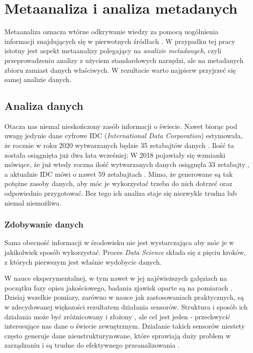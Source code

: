 \chapter{Metaanaliza i analiza metadanych} \label{ch:chapter1}

Metaanaliza oznacza wtórne odkrywanie wiedzy za pomocą uogólnienia informacji znajdujących się w pierwotnych źródłach \cite{higgins2019cochrane}.
W przypadku tej pracy istotny jest aspekt metaanalizy polegający na \textit{analizie metadanych}, czyli przeprowadzeniu analizy z użyciem standardowych narzędzi, ale na metadanych zbioru zamiast danych właściwych.
W rezultacie warto najpierw przyjrzeć się samej analizie danych.

\section{Analiza danych} \label{sec:1AnalizaDanych}

Otacza nas niemal nieskończony zasób informacji o świecie.
Nawet biorąc pod uwagę jedynie dane cyfrowe IDC (\textit{International Data Corporation}) estymowała, że rocznie w roku 2020 wytwarzanych będzie 35 zetabajtów danych \cite{tien2013big}.
Ilość ta została osiągnięta już dwa lata wcześniej; W 2018 pojawiały się wzmianki mówiące, że już wtedy roczna ilość wytwarzanych danych osiągnęła 33 zetabajty \cite{Patrizio:2018}, a aktualnie IDC mówi o nawet 59 zetabajtach \cite{IDC:2020}.
Mimo, że generowane są tak potężne zasoby danych, aby móc je wykorzystać trzeba do nich dotrzeć oraz odpowiednio przygotować.
Bez tego ich analiza staje się niezwykle trudna lub niemal niemożliwa.

	\subsection{Zdobywanie danych} \label{subsec:1ZdobywanieDanych}
	Sama obecność informacji w środowisku nie jest wystarczająca aby móc je w jakikolwiek sposób wykorzystać.
	Proces \textit{Data Science} składa się z pięciu kroków, z których pierwszym jest właśnie wydobycie danych.

	W nauce eksperymentalnej, w tym nawet w jej najświeższych gałęziach na początku fazy opisu jakościowego, badania zjawisk oparte są na pomiarach \cite{brandt1998data}.
	Dzisiaj wszelkie pomiary, zarówno w nauce jak zastosowaniach praktycznych, są w zdecydowanej większości rezultatem działania sensorów.
	Struktura i sposób ich działania może być zróżnicowany i złożony \cite{deshpande2004model,boyer2009scada}, ale cel jest jeden - przechwycić interesujące nas dane o świecie zewnętrznym.
	Działanie takich sensorów niestety często generuje dane nieustrukturyzowane, które sprawiają duży problem w zarządzaniu i są trudne do efektywnego przeanalizowania \cite{blumberg2003problem}.
	



